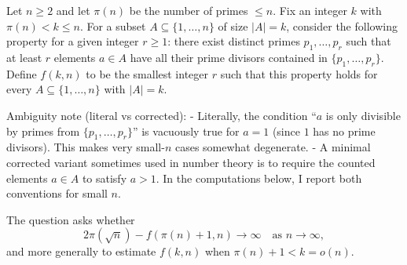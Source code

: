 Let $n\ge 2$ and let $\pi(n)$ be the number of primes $\le n$. Fix an integer $k$ with $\pi(n)<k\le n$.
For a subset $A\subseteq\{1,\dots,n\}$ of size $|A|=k$, consider the following property for a given integer $r\ge 1$:
there exist distinct primes $p_1,\dots,p_r$ such that at least $r$ elements $a\in A$ have all their prime divisors contained in $\{p_1,\dots,p_r\}$.
Define $f(k,n)$ to be the smallest integer $r$ such that this property holds for every $A\subseteq\{1,\dots,n\}$ with $|A|=k$.

Ambiguity note (literal vs corrected):
- Literally, the condition ``$a$ is only divisible by primes from $\{p_1,\dots,p_r\}$'' is vacuously true for $a=1$ (since $1$ has no prime divisors). This makes very small-$n$ cases somewhat degenerate.
- A minimal corrected variant sometimes used in number theory is to require the counted elements $a\in A$ to satisfy $a>1$.
In the computations below, I report both conventions for small $n$.

The question asks whether
\[
2\pi(\sqrt n)-f(\pi(n)+1,n)\to\infty\quad\text{as }n\to\infty,
\]
and more generally to estimate $f(k,n)$ when $\pi(n)+1<k=o(n)$.
